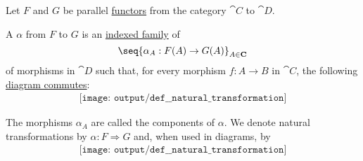 \begin{definition}\label{def:natural_transformation}
  Let \( F \) and \( G \) be parallel \hyperref[def:functor]{functors} from the category \( \cat{C} \) to \( \cat{D} \).

  A  \( \alpha \) from \( F \) to \( G \) is an \hyperref[def:cartesian_product/indexed_family]{indexed family} of
  \begin{equation}\label{eq:def:natural_transformation/family}
    \seq{ \alpha_A: F(A) \to G(A) }_{A \in \cat{C}}
  \end{equation}
  of morphisms in \( \cat{D} \) such that, for every morphism \( f: A \to B \) in \( \cat{C} \), the following \hyperref[def:categorical_diagram]{diagram commutes}:
  \begin{equation}\label{eq:def:natural_transformation/diagram}
    \begin{aligned}
      \texttt{[image: output/def\_\_natural\_transformation]}
    \end{aligned}
  \end{equation}

  The morphisms \( \alpha_A \) are called the components of \( \alpha \). We denote natural transformations by \( \alpha: F \Rightarrow G \) and, when used in diagrams, by
  \begin{equation}\label{eq:def:natural_transformation/notation}
    \begin{aligned}
      \texttt{[image: output/def\_\_natural\_transformation]}
    \end{aligned}
  \end{equation}
\end{definition}

